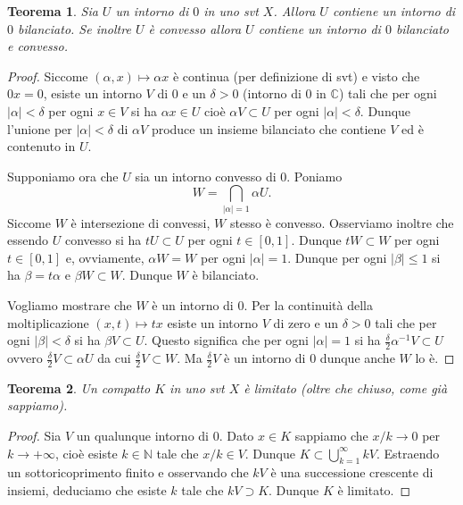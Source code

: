 \documentclass[italian,a4paper,oneside,headinclude]{scrbook}
\newcommand{\CC}{\mathbb C}
\newcommand{\NN}{\mathbb N}
\newcommand{\abs}[1]{{\left|#1\right|}}
\newtheorem{theorem}{Teorema}
\begin{document}
\begin{theorem}
  Sia $U$ un intorno di $0$ in uno svt $X$. Allora $U$ contiene un
  intorno di $0$ bilanciato. Se inoltre $U$ è convesso allora $U$
  contiene un intorno di $0$ bilanciato e convesso.
\end{theorem}
\begin{proof}
Siccome $(\alpha, x)\mapsto \alpha x$ è continua (per definizione di svt)
e visto che $0 x= 0$, esiste un intorno $V$ di $0$ e un $\delta>0$
(intorno di $0$ in $\CC$)
tali che per ogni $\abs{\alpha} < \delta$ per ogni $x\in V$ si ha $\alpha
x\in U$ cioè $\alpha V\subset U$ per ogni $\abs{\alpha}<\delta$.
Dunque l'unione per $\abs{\alpha}< \delta$ di $\alpha V$ produce un
insieme bilanciato che contiene $V$ ed è contenuto in $U$.

Supponiamo ora che $U$ sia un intorno convesso di $0$. Poniamo
\[
W = \bigcap_{\abs{\alpha}=1} \alpha U.
\]
Siccome $W$ è intersezione di convessi, $W$ stesso è convesso.
Osserviamo inoltre che essendo $U$ convesso si ha $tU \subset U$ per
ogni $t\in [0,1]$. Dunque $tW \subset W$ per ogni $t\in[0,1]$ e,
ovviamente, $\alpha W = W$ per ogni $\abs{\alpha}=1$. Dunque per ogni
$\abs{\beta}\le 1$ si ha $\beta = t \alpha$ e $\beta W \subset
W$. Dunque $W$ è bilanciato.

Vogliamo mostrare che $W$ è un intorno di $0$. Per la continuità della
moltiplicazione $(x,t)\mapsto tx$ esiste un intorno $V$ di zero e un
$\delta>0$ tali che per ogni $\abs{\beta} < \delta$ si ha
$\beta V \subset U$. Questo significa che per ogni $\abs{\alpha}=1$
si ha $\frac{\delta}{2}\alpha^{-1} V \subset U$ ovvero
$\frac \delta 2 V \subset \alpha U$ da cui
$\frac \delta 2 V \subset W$. Ma $\frac \delta 2 V$ è un intorno di $0$ dunque
anche $W$ lo è.
\end{proof}

\begin{theorem}
  Un compatto $K$ in uno svt $X$ è limitato (oltre che chiuso, come
  già sappiamo).
\end{theorem}
\begin{proof}
  Sia $V$ un qualunque intorno di $0$. Dato $x\in K$ sappiamo che
  $x/k \to 0$ per $k\to +\infty$, cioè esiste $k\in \NN$ tale che
  $x/k \in V$. Dunque $K\subset \bigcup_{k=1}^\infty kV$.
  Estraendo un sottoricoprimento finito e osservando che $kV$ è una
  successione crescente di insiemi, deduciamo che esiste $k$ tale che
  $kV\supset K$. Dunque $K$ è limitato.
\end{proof}
\end{document}
